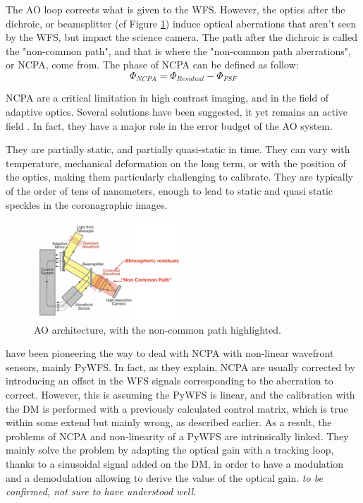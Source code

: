 \documentclass[twocolumn]{aastex62}
\begin{document}
The AO loop corrects what is given to the WFS. However, the optics after the dichroic, or beamsplitter (cf Figure \ref{fig:NCPA}) induce optical aberrations that aren't seen by the WFS, but impact the science camera. The path after the dichroic is called the "non-common path", and that is where the "non-common path aberrations", or NCPA, come from. 
The phase of NCPA can be defined as follow: 
\begin{equation}
    \Phi_{NCPA} = \Phi_{Residual} - \Phi_{PSF}
\end{equation}

NCPA are a critical limitation in high contrast imaging, and in the field of adaptive optics. Several solutions have been suggested, it yet remains an active field \citep{Vigan2018NCPA, BosFF2020}. In fact, they have a major role in the error budget of the AO system.

They are partially static, and partially quasi-static in time. They can vary with temperature, mechanical deformation on the long term, or with the position of the optics, making them particularly challenging to calibrate. They are typically of the order of tens of nanometers, enough to lead to static and quasi static speckles in the coronagraphic images.

\begin{figure}[h!]
  \centering
    \includegraphics[width=0.5\textwidth]{fig/NCPA.png}
      \caption{AO architecture, with the non-common path highlighted.}
    \label{fig:NCPA}
\end{figure}


\cite{Esposito2015} have been pioneering the way to deal with NCPA with non-linear wavefront sensors, mainly PyWFS. 
In fact, as they explain, NCPA are usually corrected by introducing an offset in the WFS signals corresponding to the aberration to correct. However, this is assuming the PyWFS is linear, and the calibration with the DM is performed with a previously calculated control matrix, which is true within some extend but mainly wrong, as described earlier. 
As a result, the problems of NCPA and non-linearity of a PyWFS are intrinsically linked. They mainly solve the problem by adapting the optical gain with a tracking loop, thanks to a sinusoidal signal added on the DM, in order to have a modulation and a demodulation allowing to derive the value of the optical gain. \textit{to be confirmed, not sure to have understood well.}\\
\end{document}
